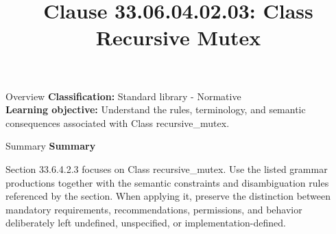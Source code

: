 \documentclass[10pt,letterpaper]{article}
\title{Clause 33.06.04.02.03: Class Recursive Mutex}
\author{}
\date{}
\begin{document}
\maketitle
\begin{CornellOverviewBox}{Overview}
\textbf{Classification:} Standard library - Normative\\[2pt]
\textbf{Learning objective:} Understand the rules, terminology, and semantic consequences associated with Class recursive\_mutex.
\end{CornellOverviewBox}\begin{CornellSummaryBox}{Summary}
{\sffamily\bfseries\color{Accent} Summary}\par\vspace{3pt}Section 33.6.4.2.3 focuses on Class recursive\_mutex. Use the listed grammar productions together with the semantic constraints and disambiguation rules referenced by the section. When applying it, preserve the distinction between mandatory requirements, recommendations, permissions, and behavior deliberately left undefined, unspecified, or implementation-defined.
\end{CornellSummaryBox}
\end{document}
